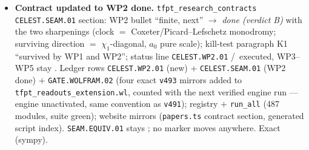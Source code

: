 \begin{itemize}[leftmargin=1.5em]
$\Z_4$ wrap, conserving the $\mu_4$ grade --- no sector leak, the \texttt{v492} equivariant sector deforms
consistently; $a_0\leftrightarrow$ BHS's weight-$0$ $c^2$ slot; matrix factorisations deform along all orbit
splittings, the clock fixing exactly the antipodal $2{+}2$ sector ($=$ the EH/$\Z_2$ middle node,
$4{=}2{\times}2$). \emph{Negative controls:} $a_1Z\Rightarrow j{=}0$ (hexagonal); pure $a_2Z^2$ stays
singular ($A_1$); $a_2{\neq}0\Rightarrow j{=}1556068/81{\neq}1728$; explicit grading leak --- doubly sharp.
\emph{Verdict B} via three named \mC\ identifications ($-4$Nambu $=$ the $k{=}4$ CCA bracket; period $=$
root difference; seam-scale reading via clock$^2{=}$deck); the \texttt{v216} residual is \emph{typed}, not
moved (given the order-$4$ clock the square is automatic --- a relocation of the same input, no new
derivation).
\item \textbf{Contract updated to WP2 done.} \texttt{tfpt\_research\_contracts} \texttt{CELEST.SEAM.01}
section: WP2 bullet ``finite, next'' $\to$ \emph{done (verdict B)} with the two sharpenings (clock $=$
Coxeter/Picard--Lefschetz monodromy; surviving direction $=$ $\chi_1$-diagonal, $a_0$ pure scale);
kill-test paragraph K1 ``survived by WP1 and WP2''; status line \texttt{CELEST.WP2.01} \mE/\mC\ executed,
WP3--WP5 stay \mO. Ledger rows \texttt{CELEST.WP2.01} (new) $+$ \texttt{CELEST.SEAM.01} (WP2 done) $+$
\texttt{GATE.WOLFRAM.02} (four exact \texttt{v493} mirrors added to
\texttt{tfpt\_readouts\_extension.wl}, counted with the next verified engine run --- engine unactivated,
same convention as \texttt{v491}); registry $+$ \texttt{run\_all} (487 modules, suite green); website mirrors
(\texttt{papers.ts} contract section, generated script index). \texttt{SEAM.EQUIV.01} stays \mO; no marker
moves anywhere. Exact (sympy).
\end{itemize}

